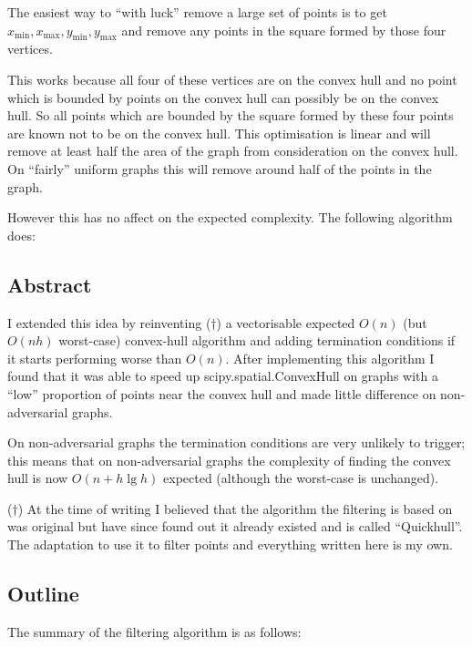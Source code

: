 \documentclass[10pt,\jkfside,a4paper]{article}
\begin{document}
\begin{enumerate}
The easiest way to ``with luck'' remove a large set of points is to get 
$x_{\min}, x_{\max}, y_{\min}, y_{\max}$ and remove any points in the square 
formed by those four vertices.

This works because all four of these vertices are on the convex hull and no point 
which is bounded by points on the convex hull can possibly be on the convex hull. 
So all points which are bounded by the square formed by these four points are known 
not to be on the convex hull. This optimisation is linear and will remove at least half 
the area of the graph from consideration on the convex hull. On ``fairly'' uniform 
graphs this will remove around half of the points in the graph.

However this has no affect on the expected complexity. The following algorithm does:

\vspace{0.3cm}

\subsection*{Abstract}

I extended this idea by reinventing ($\dag$) a vectorisable expected $O(n)$ 
(but $O(nh)$ worst-case) convex-hull algorithm and adding 
termination conditions if it starts performing worse than $O(n)$. After 
implementing this algorithm I found that it was able to speed up 
scipy.spatial.ConvexHull on graphs with a ``low'' proportion of points near the 
convex hull and made little difference on non-adversarial graphs.

On non-adversarial graphs the termination conditions are very unlikely to trigger; 
this means that on non-adversarial graphs the complexity of finding the 
convex hull is now $O(n + h \lg h)$ expected (although the worst-case is unchanged).

($\dag$) At the time of writing I believed that the algorithm the filtering 
is based on was original but have since found out it already existed and is called 
``Quickhull''. The adaptation to use it to filter points and everything written 
here is my own.

\vspace{0.3cm}

\subsection*{Outline}

The summary of the filtering algorithm is as follows:


\end{enumerate}
\end{document}
